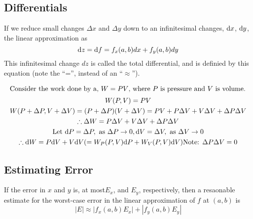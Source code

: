 \documentclass{report}
\begin{document}
\subsection*{Differentials}
If we reduce small changes $\Delta x$ and $\Delta y$ down to an infinitesimal changes, $\mathrm{d} x$, $\mathrm{d} y$, the linear approximation as
$$
	\mathrm{d} z = \mathrm{d} f = f_x(a,b)dx + f_y(a,b)dy
$$
This infinitesimal change $dz$ is called the total differential, and is definied by this equation (note the ``='', instead of an ``$\approx$'').

\begin{gather*}
	\intertext{Consider the work done by a, $W=PV$, where $P$ is pressure and $V$ is volume.}
	W(P,V) = PV \\
	W(P+\Delta P, V+\Delta V) = (P+\Delta P)(V+\Delta V) = PV + P\Delta V + V\Delta V + \Delta P\Delta V \\
	\therefore \Delta W = P\Delta V + V\Delta V + \Delta P\Delta V \\
	\text{Let } \mathrm{d} P = \Delta P, \text{ as }\Delta P\to 0, \mathrm{d} V = \Delta V, \text{ as }\Delta V\to 0 \\
	\therefore \mathrm{d} W = P\mathrm{d} V + V\mathrm{d} V ( = W_P(P,V)\mathrm{d} P + W_V(P,V)\mathrm{d} V)
	\text{Note: } \Delta P\Delta V = 0
\end{gather*}

\subsection*{Estimating Error}
If the error in $x$ and $y$ is, at most$E_x$, and $E_y$, respectively, then a resaonable estimate for the worst-case error in the linear approximation of $f$ at $(a,b)$ is
$$
	|E| \approx |f_x(a,b)E_x| + |f_y(a,b)E_y|
$$

\end{document}
